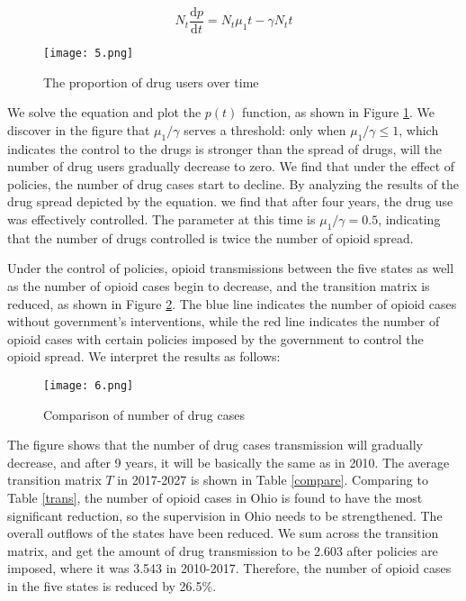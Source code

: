 \documentclass[13pt]{ctexart}
\begin{document}
\begin{equation}
	N_t\frac{\mathrm{d}p}{\mathrm{d}t}=N_t\mu_1t-\gamma N_t t
\end{equation}

\begin {figure}[h]
	\centering %
	\texttt{[image: 5.png]}
	\caption{The proportion of drug users over time} %
	\label{SIS}
\end {figure}

We solve the equation and plot the $p(t)$ function, as shown in Figure \ref{SIS}. We discover in the figure that $\mu_1 / \gamma $ serves a threshold: only when $\mu_1 / \gamma \leq 1$, which indicates the control to the drugs is stronger than the spread of drugs, will the number of drug users gradually decrease to zero. We find that under the effect of policies, the number of drug cases start to decline. By analyzing the results of the drug spread depicted by the equation. we find that after four years, the drug use was effectively controlled. The parameter at this time is $\mu_1 / \gamma = 0.5$, indicating that the number of drugs controlled is twice the number of opioid spread.

Under the control of policies, opioid transmissions between the five states as well as the number of opioid cases begin to decrease, and the transition matrix is reduced, as shown in Figure \ref{trans_adjust}. The blue line indicates the number of opioid cases without government's interventions, while the red line indicates the number of opioid cases with certain policies imposed by the government to control the opioid spread. We interpret the results as follows:
\begin {figure}[h]
	\centering %
	\texttt{[image: 6.png]}
	\caption{Comparison of number of drug cases} %
	\label{trans_adjust}
\end {figure}

The figure shows that the number of drug cases transmission will gradually decrease, and after 9 years, it will be basically the same as in 2010. The average transition matrix $T$ in 2017-2027 is shown in Table \ref{compare}. Comparing to Table \ref{trans}, the number of opioid cases in Ohio is found to have the most significant reduction, so the supervision in Ohio needs to be strengthened. The overall outflows of the states have been reduced. We sum across the transition matrix, and get the amount of drug transmission to be 2.603 after policies are imposed, where it was 3.543 in 2010-2017. Therefore, the number of opioid cases in the five states is reduced by 26.5\%.
\end{document}
